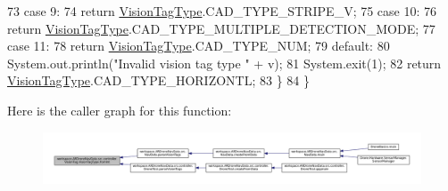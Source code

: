 \begin{DoxyCode}
73             \textcolor{keywordflow}{case} 9:
74                 \textcolor{keywordflow}{return} \hyperlink{enumworkspace_1_1_a_r_drone_nav_data_1_1src_1_1controller_1_1_vision_tag_1_1_vision_tag_type_aa0dc7f7b13ee1c97b681ff08c3c1f72c}{VisionTagType}.CAD\_TYPE\_STRIPE\_V;
75             \textcolor{keywordflow}{case} 10:
76                 \textcolor{keywordflow}{return} \hyperlink{enumworkspace_1_1_a_r_drone_nav_data_1_1src_1_1controller_1_1_vision_tag_1_1_vision_tag_type_aa0dc7f7b13ee1c97b681ff08c3c1f72c}{VisionTagType}.CAD\_TYPE\_MULTIPLE\_DETECTION\_MODE;
77             \textcolor{keywordflow}{case} 11:
78                 \textcolor{keywordflow}{return} \hyperlink{enumworkspace_1_1_a_r_drone_nav_data_1_1src_1_1controller_1_1_vision_tag_1_1_vision_tag_type_aa0dc7f7b13ee1c97b681ff08c3c1f72c}{VisionTagType}.CAD\_TYPE\_NUM;
79             \textcolor{keywordflow}{default}:
80                 System.out.println(\textcolor{stringliteral}{"Invalid vision tag type "} + v);
81                 System.exit(1);
82                 \textcolor{keywordflow}{return} \hyperlink{enumworkspace_1_1_a_r_drone_nav_data_1_1src_1_1controller_1_1_vision_tag_1_1_vision_tag_type_aa0dc7f7b13ee1c97b681ff08c3c1f72c}{VisionTagType}.CAD\_TYPE\_HORIZONTL;
83             \}
84         \}
\end{DoxyCode}


Here is the caller graph for this function\+:\nopagebreak
\begin{figure}[H]
\begin{center}
\leavevmode
\includegraphics[width=350pt]{enumworkspace_1_1_a_r_drone_nav_data_1_1src_1_1controller_1_1_vision_tag_1_1_vision_tag_type_aa89559232be30c617a99c38963177232_icgraph}
\end{center}
\end{figure}


\hypertarget{enumworkspace_1_1_a_r_drone_nav_data_1_1src_1_1controller_1_1_vision_tag_1_1_vision_tag_type_ac3061c701071f4218f57e6fa54b65482}{}
